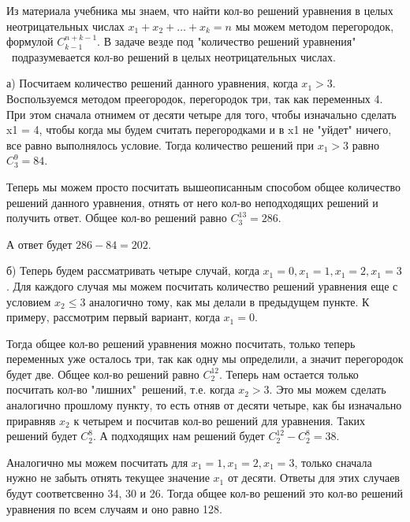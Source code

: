 	Из материала учебника мы знаем, что найти кол-во решений уравнения в целых неотрицательных числах $x_1 + x_2 + \dots + x_k = n$ мы можем методом перегородок, формулой $C_{k - 1}^{n + k - 1}$.
	В задаче везде под "количество решений уравнения" \  подразумевается кол-во решений в целых неотрицательных числах.
	
	а) Посчитаем количество решений данного уравнения, когда $x_1 > 3$. Воспользуемся методом преегородок, перегородок три, так как переменных 4. При этом сначала отнимем от десяти четыре для того, чтобы изначально сделать x1 = 4, чтобы когда мы будем считать перегородками и в x1 не "уйдет" ничего, все равно выполнялось условие. Тогда количество решений при $x_1 > 3$ равно $C_{3}^{9} = 84$.
	
	Теперь мы можем просто посчитать вышеописанным способом общее количество решений данного уравнения, отнять от него кол-во неподходящих решений и получить ответ. Общее кол-во решений равно $C_{3}^{13} = 286$.
	
	А ответ будет $286 - 84 = 202$.
	
	б) Теперь будем рассматривать четыре случай, когда $x_1=0, x_1=1, x_1=2, x_1=3$. Для каждого случая мы можем посчитать количество решений уравнения еще с условием $x_2 \le 3$ аналогично тому, как мы делали в предыдущем пункте. 
	К примеру, рассмотрим первый вариант, когда $x_1=0$. 
	
	Тогда общее кол-во решений уравнения можно посчитать, только теперь переменных уже осталось три, так как одну мы определили, а значит перегородок будет две.  Общее кол-во решений равно $C_{2}^{12}$. Теперь нам остается только посчитать кол-во "лишних"\  решений, т.е. когда $x_2 > 3$. Это мы можем сделать аналогично прошлому пункту, то есть отняв от десяти четыре, как бы изначально приравняв $x_2$ к четырем и посчитав кол-во решений для уравнения. Таких решений будет $C_{2}^{8}$. А подходящих нам решений будет $ C_{2}^{12} - C_{2}^{8} = 38$.
	
	Аналогично мы можем посчитать для $x_1=1, x_1=2, x_1=3$, только сначала нужно не забыть отнять текущее значение $x_1$ от десяти.
	Ответы для этих случаев будут соответсвенно 34, 30 и 26.
	Тогда общее кол-во решений это кол-во решений уравнения по всем случаям и оно равно 128.
	
	
	